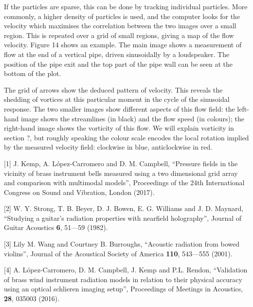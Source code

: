   If the particles are sparse, this can be done by tracking individual 
  particles. More commonly, a higher density of particles is used, and the 
  computer looks for the velocity which maximises the correlation between the 
  two images over a small region. This is repeated over a grid of small 
  regions, giving a map of the flow velocity. Figure 14 shows an example. The 
  main image shows a measurement of flow at the end of a vertical pipe, driven 
  sinusoidally by a loudspeaker. The position of the pipe exit and the top part 
  of the pipe wall can be seen at the bottom of the plot. 


  The grid of arrows show the deduced pattern of velocity. This reveals the 
  shedding of vortices at this particular moment in the cycle of the sinusoidal 
  response. The two smaller images show different aspects of this flow field: 
  the left-hand image shows the streamlines (in black) and the flow speed (in 
  colours); the right-hand image shows the vorticity of this flow. We will 
  explain vorticity in section ?, but roughly speaking the colour scale encodes 
  the local rotation implied by the measured velocity field: clockwise in blue, 
  anticlockwise in red. 



  \sectionreferences{}[1] J. Kemp, A. López-Carromero and D. M. Campbell, 
  “Pressure fields in the vicinity of brass instrument bells measured using a 
  two dimensional grid array and comparison with multimodal models”, 
  Proceedings of the 24th International Congress on Sound and Vibration, London 
  (2017). 

  [2] W. Y. Strong, T. B. Beyer, D. J. Bowen, E. G. Williams and J. D. Maynard, 
  “Studying a guitar’s radiation properties with nearfield holography”, Journal 
  of Guitar Acoustics \textbf{6}, 51—59 (1982). 

  [3] Lily M. Wang and Courtney B. Burroughs, “Acoustic radiation from bowed 
  violins”, Journal of the Acoustical Society of America \textbf{110}, 543—555 
  (2001). 

  [4] A. López-Carromero, D. M. Campbell, J. Kemp and P.L. Rendon, “Validation 
  of brass wind instrument radiation models in relation to their physical 
  accuracy using an optical schlieren imaging setup”, Proceedings of Meetings 
  in Acoustics, \textbf{28}, 035003 (2016). 